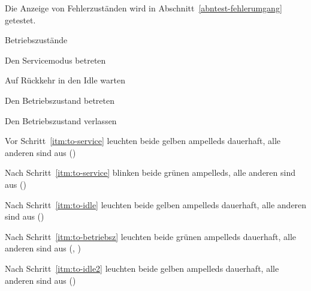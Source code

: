 \label{abntest-zustandsanzeigen}
\begin{anmerkungen}
    \item Die Anzeige von Fehlerzuständen wird in Abschnitt~\ref{abntest-fehlerumgang} getestet.
\end{anmerkungen}

\begin{ablauf}{Betriebszustände}
    \item \label{itm:to-service} Den Servicemodus betreten
    \item \label{itm:to-idle} Auf Rückkehr in den Idle warten
    \item \label{itm:to-betriebsz} Den Betriebszustand betreten
    \item \label{itm:to-idle2} Den Betriebszustand verlassen
\end{ablauf}
\begin{erwartung}
    \item Vor Schritt~\ref{itm:to-service} leuchten
    beide gelben \glspl{ampelled} dauerhaft, alle anderen sind aus ()
    \item Nach Schritt~\ref{itm:to-service} blinken
    beide grünen \glspl{ampelled}, alle anderen sind aus ()
    \item Nach Schritt~\ref{itm:to-idle} leuchten
    beide gelben \glspl{ampelled} dauerhaft, alle anderen sind aus ()
    \item Nach Schritt~\ref{itm:to-betriebsz} leuchten
    beide grünen \glspl{ampelled} dauerhaft, alle anderen sind aus (, )
    \item Nach Schritt~\ref{itm:to-idle2} leuchten
    beide gelben \glspl{ampelled} dauerhaft, alle anderen sind aus ()
\end{erwartung}
